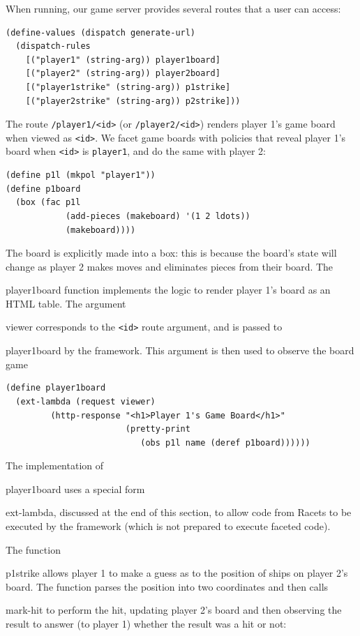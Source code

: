 \documentclass[review=true,acmlarge]{acmart}
\newcommand*{\SavedLstInline}{}
\DeclareRobustCommand*{\lstinline}{%
  \ifmmode
    \let\SavedBGroup\bgroup
    \def\bgroup{%
      \let\bgroup\SavedBGroup
      \hbox\bgroup
    }%
  \fi
  \SavedLstInline
}
\newcommand{\code}[1]{\lstinline{#1}}
\begin{document}
When running, our game server provides several routes that a user can
access:

\begin{lstlisting}[language=Racket,escapechar=|,name=case]
(define-values (dispatch generate-url)
  (dispatch-rules
    [("player1" (string-arg)) player1board]
    [("player2" (string-arg)) player2board]
    [("player1strike" (string-arg)) p1strike]
    [("player2strike" (string-arg)) p2strike]))
\end{lstlisting}

The route \texttt{/player1/<id>} (or \texttt{/player2/<id>}) renders
player 1's game board when viewed as \texttt{<id>}. We facet game
boards with policies that reveal player 1's board when \texttt{<id>}
is \texttt{player1}, and do the same with player 2:

\begin{lstlisting}[language=Racket,escapechar=|,name=case]
(define p1l (mkpol "player1"))
(define p1board
  (box (fac p1l
            (add-pieces (makeboard) '(1 2 ldots))
            (makeboard))))
\end{lstlisting}

The board is explicitly made into a box: this is because the board's
state will change as player 2 makes moves and eliminates pieces from
their board. The \code{player1board} function implements the logic to
render player 1's board as an HTML table. The argument \code{viewer}
corresponds to the \texttt{<id>} route argument, and is passed to
\code{player1board} by the framework. This argument is then used to
observe the board game

\begin{lstlisting}[language=Racket,escapechar=|,name=case]
(define player1board
  (ext-lambda (request viewer)
         (http-response "<h1>Player 1's Game Board</h1>"
                        (pretty-print 
                           (obs p1l name (deref p1board))))))
\end{lstlisting}

The implementation of \code{player1board} uses a special form
\code{ext-lambda}, discussed at the end of this section, to allow code
from Racets to be executed by the framework (which is not prepared to
execute faceted code).

The function \code{p1strike} allows player 1 to make a guess as to the
position of ships on player 2's board. The function parses the
position into two coordinates and then calls \code{mark-hit} to
perform the hit, updating player 2's board and then observing the
result to answer (to player 1) whether the result was a hit or not:
\end{document}
